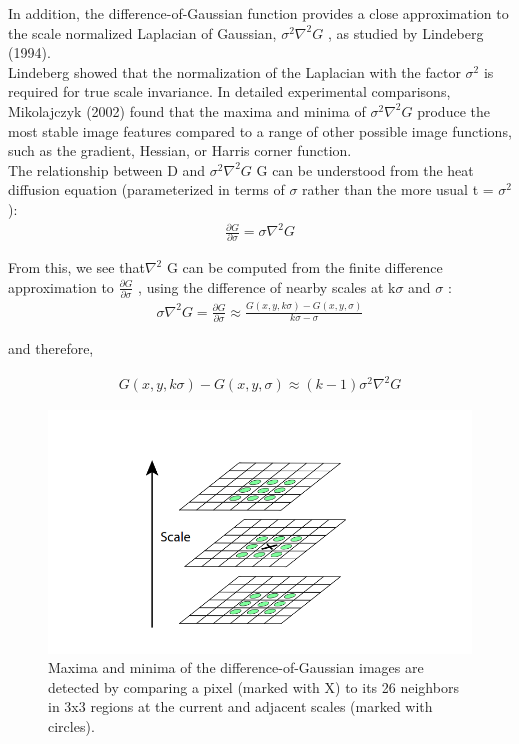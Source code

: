 In addition, the difference-of-Gaussian function provides a close approximation to the
scale normalized Laplacian of Gaussian, $\sigma^2\nabla^2 G $
, as studied by Lindeberg (1994).\\Lindeberg
showed that the normalization of the Laplacian with the factor $\sigma^2$
is required for true scale invariance. In detailed experimental comparisons, Mikolajczyk (2002) found that the maxima and minima of $\sigma^2\nabla^2 G $  produce the most stable image features compared to a range
of other possible image functions, such as the gradient, Hessian, or Harris corner function.\\
The relationship between D and $\sigma^2\nabla^2G $
G can be understood from the heat diffusion
equation (parameterized in terms of $\sigma$ rather than the more usual t = $\sigma^2$):\\

\begin{align}
    \frac {\partial G} {\partial \sigma} = \sigma \nabla^2 G 
\end{align}




From this, we see that$\nabla^2$ G can be computed from the finite difference approximation to  $\frac{\partial G}{\partial \sigma }$ , using the difference of nearby scales at k$\sigma$ and $\sigma$ :\\


\begin{align}
      \sigma \nabla^2 G =   \frac {\partial G} {\partial \sigma} \approx   \frac {G(x,y,k \sigma) -  G(x,y,\sigma)}{ k \sigma - \sigma}  
\end{align}


and therefore,


\begin{align}
      G(x,y,k \sigma) -  G(x,y,\sigma)  \approx (k - 1)  \sigma^2\nabla^2G 
\end{align}

\begin{figure}[H]
\centering
\includegraphics[width=1.0\textwidth]{img/sift2.PNG}
\caption{ Maxima and minima of the difference-of-Gaussian images are detected by comparing a
pixel (marked with X) to its 26 neighbors in 3x3 regions at the current and adjacent scales (marked
with circles).}
\label{fig:sift2}
\end{figure}

